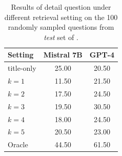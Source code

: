 \begin{table}[!t]
  \centering
  \small
  \begin{tabular}{lcc}
    \toprule
    \textbf{Setting} & \textbf{Mistral 7B} & \textbf{GPT-4} \\
    \midrule
    title-only & 25.00 & 20.50 \\
    $k=1$ & 11.50 & 21.50 \\
    $k=2$ & 17.50 & 24.50 \\
    $k=3$ & 19.50 & 30.50 \\
    $k=4$ & 18.00 & 24.50 \\
    $k=5$ & 20.50 & 23.00 \\
    \midrule
    Oracle & 44.50 & 61.50\\    
    \bottomrule
  \end{tabular}
  \caption{Results of detail question under different retrieval setting on the 100 randomly sampled questions from \emph{test} set of \data. }
  \label{tab:different_retrieval_setting}
\end{table}